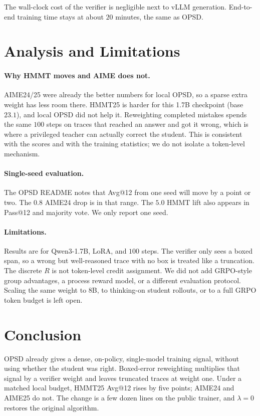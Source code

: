 \documentclass[letterpaper]{article}
\begin{document}
The wall-clock cost of the verifier is negligible next to vLLM generation. End-to-end training time stays at about $20$ minutes, the same as OPSD.

\section{Analysis and Limitations}

\paragraph{Why HMMT moves and AIME does not.}
AIME24/25 were already the better numbers for local OPSD, so a sparse extra weight has less room there. HMMT25 is harder for this 1.7B checkpoint (base $23.1$), and local OPSD did not help it. Reweighting completed mistakes spends the same $100$ steps on traces that reached an answer and got it wrong, which is where a privileged teacher can actually correct the student. This is consistent with the scores and with the training statistics; we do not isolate a token-level mechanism.

\paragraph{Single-seed evaluation.}
The OPSD README notes that Avg@12 from one seed will move by a point or two. The $0.8$ AIME24 drop is in that range. The $5.0$ HMMT lift also appears in Pass@12 and majority vote. We only report one seed.

\paragraph{Limitations.}
Results are for Qwen3-1.7B, LoRA, and $100$ steps. The verifier only sees a boxed span, so a wrong but well-reasoned trace with no box is treated like a truncation. The discrete $R$ is not token-level credit assignment. We did not add GRPO-style group advantages, a process reward model, or a different evaluation protocol. Scaling the same weight to 8B, to thinking-on student rollouts, or to a full GRPO token budget is left open.

\section{Conclusion}

OPSD already gives a dense, on-policy, single-model training signal, without using whether the student was right. Boxed-error reweighting multiplies that signal by a verifier weight and leaves truncated traces at weight one. Under a matched local budget, HMMT25 Avg@12 rises by five points; AIME24 and AIME25 do not. The change is a few dozen lines on the public trainer, and $\lambda{=}0$ restores the original algorithm.


\end{document}
